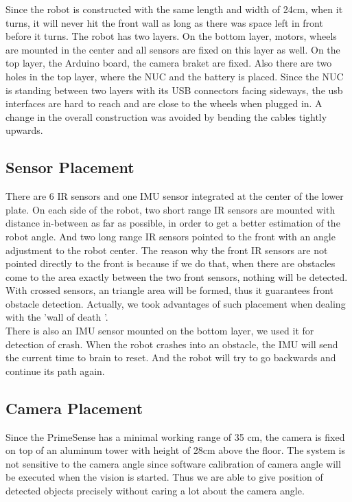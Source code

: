 \setlength{\parindent}{0pt}Since the robot is constructed with the same length and width of 24cm, when it turns, it will never hit the front wall as long as there was space left in front before it turns.
The robot has two layers. On the bottom layer, motors, wheels are mounted in the center and all sensors are fixed on this layer as well.
On the top layer, the Arduino board, the camera braket are fixed.
Also there are two holes in the top layer, where the NUC and the battery is placed.
Since the NUC is standing between two layers with its USB connectors facing sideways, the usb interfaces are hard to reach and are close to the wheels when plugged in.
A change in the overall construction was avoided by bending the cables tightly upwards.

\subsection{Sensor Placement}
There are 6 IR sensors and one IMU sensor integrated at the center of the lower plate.
On each side of the robot, two short range IR sensors are mounted with distance in-between as far as possible, in order to get a better estimation of the robot angle. 
And two long range IR sensors pointed to the front with an angle adjustment to the robot center.  
The reason why the front IR sensors are not pointed directly to the front is because if we do that, when there are obstacles come to the area exactly between the two front sensors, nothing will be detected.
With crossed sensors, an triangle area will be formed, thus it guarantees front obstacle detection.
Actually, we took advantages of such placement when dealing with the 'wall of death '.\\

\setlength{\parindent}{0pt}There is also an IMU sensor mounted on the bottom layer, we used it for detection of crash. When the robot crashes into an obstacle, the IMU will send the current time to brain to reset.
And the robot will try to go backwards and continue its path again.

\subsection{Camera Placement}
Since the PrimeSense has a minimal working range of 35 cm, the camera is fixed on top of an aluminum tower with height of 28cm above the floor. 
The system is not sensitive to the camera angle since software calibration of camera angle will be executed when the vision is started.
Thus we are able to give position of detected objects precisely without caring a lot about the camera angle.

